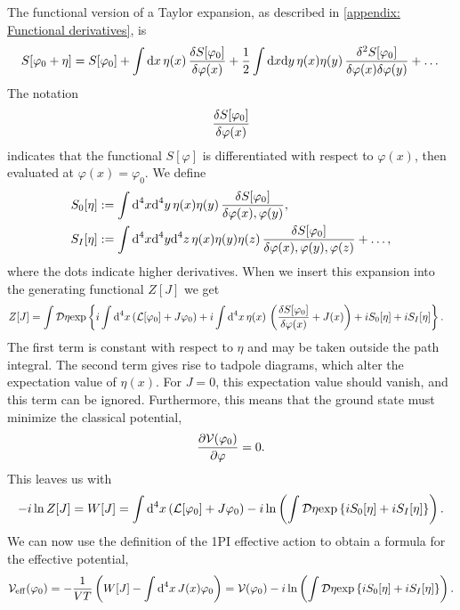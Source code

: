 The functional version of a Taylor expansion, as described in \autoref{appendix: Functional derivatives}, is
%
\begin{equation}
    S[\varphi_0 + \eta] = 
    S[\varphi_0]
    + \int \dd x \, \eta(x) \, \fdv{S[\varphi_0]}{\varphi(x)}
    + \frac{1}{2} \int \dd x \dd y\,  \eta(x) \eta(y) \,
    \frac{\delta^2 S[\varphi_0]}{\delta\varphi(x)\delta\varphi(y)}
    + \dots
\end{equation}
%
The notation
%
\begin{equation}
    \fdv{S[\varphi_0]}{\varphi(x)}
\end{equation}
%
indicates that the functional $S[\varphi]$ is differentiated with respect to $\varphi(x)$, then evaluated at $\varphi(x) = \varphi_0$.
We define
%
\begin{align}
    S_0[\eta] &:= 
    \int \dd^4 x \dd^4 y \,\eta(x)\eta(y)\, 
    \fdv{S[\varphi_0]}{\varphi(x), \varphi(y)}, \\
    S_I[\eta] &:=
    \int \dd^4 x \dd^4 y \dd^4 z \,\eta(x)\eta(y)\eta(z)\, 
    \fdv{S[\varphi_0]}{\varphi(x),\varphi(y),\varphi(z)} + \dots,
\end{align}
%
where the dots indicate higher derivatives.
When we insert this expansion into the generating functional $Z[J]$ we get
%
\begin{align}
    &Z[J] = \int \D \eta
    \exp{
        i \int \dd^4 x \left(  \Ell[\varphi_0] + J \varphi_0  \right)
        +i \int \dd^4x \, \eta(x) \, 
        \left(  \fdv{S[\varphi_0]}{\varphi(x)} + J(x) \right)
        + i S_0[\eta] + i S_I[\eta]
    }.
\end{align}
%
The first term is constant with respect to $\eta$ and may be taken outside the path integral.
The second term gives rise to tadpole diagrams, which alter the expectation value of $\eta(x)$.
For $J=0$, this expectation value should vanish, and this term can be ignored.
Furthermore, this means that the ground state must minimize the classical potential,
\begin{equation}
    \label{minimize classical potential}
    \pdv{\mathcal{V}(\varphi_0)}{\varphi} = 0.
\end{equation}
%
%
This leaves us with 
%
\begin{equation}
    -i \ln Z[J] = W[J]
    =
    \int \text{d}^4 x \left(  \mathcal{L}[\varphi_0] + J \varphi_0  \right)
    -i \ln
    \left(
        \int \mathcal D \eta\text{exp} \left\{ i S_0[\eta] + i S_I[\eta] \right\}
    \right).
\end{equation}
%
%
We can now use the definition of the 1PI effective action to obtain a formula for the effective potential,
%
\begin{equation}
    \mathcal{V}_{\mathrm{eff}}(\varphi_0)
    =- \frac{1}{VT}
    \left( 
        W[J] - \int \text{d}^4 x \, J(x) \varphi_0
    \right)
    = \mathcal{V}(\varphi_0) 
    -i \ln
    \left(
        \int \mathcal D \eta\text{exp} \left\{ i S_0[\eta] + i S_I[\eta] \right\}
    \right).
\end{equation}
%

